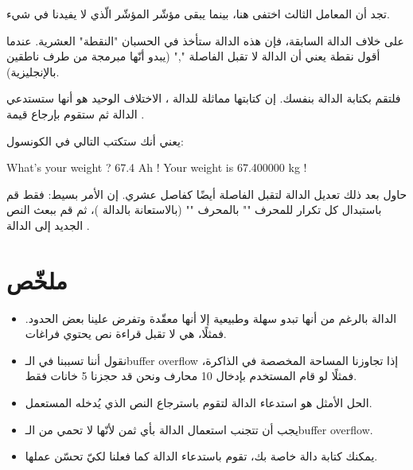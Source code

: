 تجد أن المعامل الثالث
اختفى هنا، بينما يبقى مؤشّر المؤشّر
الّذي لا يفيدنا في شيء.

على خلاف الدالة السابقة، فإن هذه الدالة ستأخذ في الحسبان "النقطة" العشرية. عندما أقول نقطة يعني أن الدالة لا تقبل الفاصلة
"\textenglish{,}"
(يبدو أنّها مبرمجة من طرف ناطقين بالإنجليزية).

فلتقم بكتابة الدالة
بنفسك. إن كتابتها مماثلة للدالة
،
الاختلاف الوحيد هو أنها ستستدعي الدالة
ثم ستقوم بإرجاع قيمة
.

يعني أنك ستكتب التالي في الكونسول:

\begin{Console}
  What's your weight ? 67.4
  Ah ! Your weight is 67.400000 kg !
\end{Console}


حاول بعد ذلك تعديل الدالة
لتقبل الفاصلة أيضًا كفاصل عشري. إن الأمر بسيط: فقط قم باستبدال كل تكرار للمحرف
"\InlineCode{,}"
بالمحرف
""
(بالاستعانة بالدالة
)،
ثم قم ببعث النص الجديد إلى الدالة
.

\section*{ملخّص}

\begin{itemize}
  \item الدالة
بالرغم من أنها تبدو سهلة وطبيعية إلا أنها معقّدة وتفرض علينا بعض الحدود. فمثلًا، هي لا تقبل قراءة نص يحتوي فراغات.
  \item نقول أننا تسببنا في الـ\textenglish{buffer overflow}
إذا تجاوزنا المساحة المخصصة في الذاكرة، فمثلًا لو قام المستخدم بإدخال 10 محارف ونحن قد حجزنا 5 خانات فقط.
  \item الحل الأمثل هو استدعاء الدالة
لتقوم باسترجاع النص الذي يُدخله المستعمل.
  \item يجب أن تتجنب استعمال الدالة
بأي ثمن لأنّها لا تحمي من الـ\textenglish{buffer overflow}.
  \item يمكنك كتابة دالة خاصة بك، تقوم باستدعاء الدالة
كما فعلنا لكيّ تحسّن عملها.
\end{itemize}
